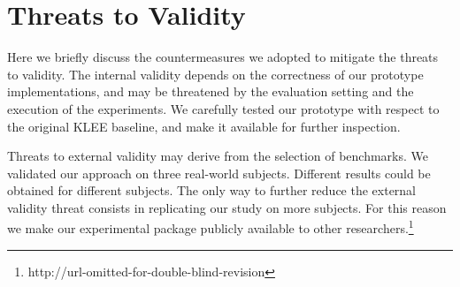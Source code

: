 \section{Threats to Validity}
Here we briefly discuss the countermeasures we adopted to mitigate the
threats to validity. The internal validity depends on the correctness
of our prototype implementations, and may be threatened by the
evaluation setting and the execution of the experiments.  We carefully
tested our prototype with respect to the original KLEE baseline, and
make it available for further inspection.

Threats to external validity may derive from the selection of
benchmarks. We validated our approach on three real-world
subjects. Different results could be obtained for different
subjects. The only way to further reduce the external validity threat
consists in replicating our study on more subjects. For this reason we
make our experimental package publicly available to other
researchers.\footnote{http://url-omitted-for-double-blind-revision}


